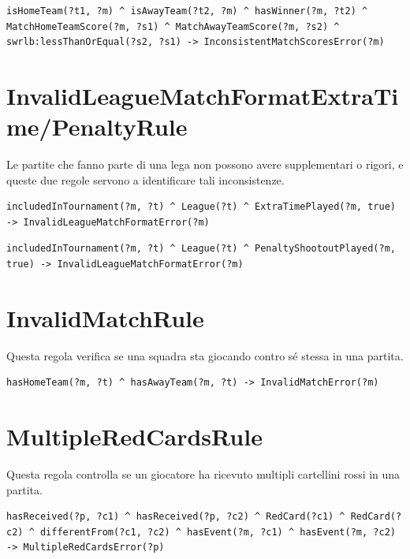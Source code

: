 \documentclass[11pt]{report} %
\begin{document}
\begin{lstlisting}[language=SWRL]
isHomeTeam(?t1, ?m) ^ isAwayTeam(?t2, ?m) ^ hasWinner(?m, ?t2) ^ MatchHomeTeamScore(?m, ?s1) ^ MatchAwayTeamScore(?m, ?s2) ^ swrlb:lessThanOrEqual(?s2, ?s1) -> InconsistentMatchScoresError(?m)
\end{lstlisting}

\section{InvalidLeagueMatchFormatExtraTime/PenaltyRule}

Le partite che fanno parte di una lega non possono avere supplementari o rigori, e queste due regole servono a identificare tali inconsistenze.

\begin{lstlisting}[language=SWRL]
includedInTournament(?m, ?t) ^ League(?t) ^ ExtraTimePlayed(?m, true) -> InvalidLeagueMatchFormatError(?m)
\end{lstlisting}

\begin{lstlisting}[language=SWRL]
includedInTournament(?m, ?t) ^ League(?t) ^ PenaltyShootoutPlayed(?m, true) -> InvalidLeagueMatchFormatError(?m)
\end{lstlisting}

\section{InvalidMatchRule}

Questa regola verifica se una squadra sta giocando contro sé stessa in una partita.

\begin{lstlisting}[language=SWRL]
hasHomeTeam(?m, ?t) ^ hasAwayTeam(?m, ?t) -> InvalidMatchError(?m)
\end{lstlisting}

\section{MultipleRedCardsRule}

Questa regola controlla se un giocatore ha ricevuto multipli cartellini rossi in una partita.

\begin{lstlisting}[language=SWRL]
hasReceived(?p, ?c1) ^ hasReceived(?p, ?c2) ^ RedCard(?c1) ^ RedCard(?c2) ^ differentFrom(?c1, ?c2) ^ hasEvent(?m, ?c1) ^ hasEvent(?m, ?c2) -> MultipleRedCardsError(?p)
\end{lstlisting}
\end{document}
